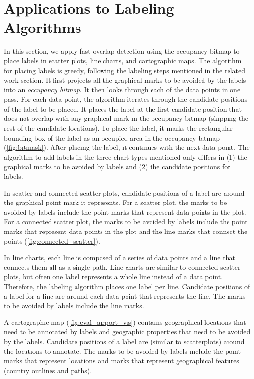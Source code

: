 \section{Applications to Labeling Algorithms}

In this section, we apply fast overlap detection using the occupancy bitmap
to place labels in scatter plots, line charts, and cartographic maps.
The algorithm for placing labels is greedy, following the labeling steps mentioned in the related work section.
It first projects all the graphical marks to be avoided by the labels into an \emph{occupancy bitmap}.
It then looks through each of the data points in one pass.
For each data point, the algorithm iterates through the candidate positions of the label to be placed.
It places the label at the first candidate position that does not overlap with any graphical mark in the occupancy bitmap (skipping the rest of the candidate locations).
To place the label, it marks the rectangular bounding box of the label as an occupied area in the occupancy bitmap (\autoref{fig:bitmask}).
After placing the label, it continues with the next data point.
The algorithm to add labels in the three chart types mentioned only differs in
(1) the graphical marks to be avoided by labels
and (2) the candidate positions for labels.

In scatter and connected scatter plots, candidate positions of a label are around the graphical point mark it represents.
For a scatter plot, the marks to be avoided by labels include the point marks that represent data points in the plot.
For a connected scatter plot, the marks to be avoided by labels include the point marks that represent data points in the plot and the line marks that connect the points (\autoref{fig:connected_scatter}).

In line charts, each line is composed of a series of data points and a line that connects them all as a single path.
Line charts are similar to connected scatter plots, but often one label represents a whole line instead of a data point.
Therefore, the labeling algorithm places one label per line.
Candidate positions of a label for a line are around each data point that represents the line.
The marks to be avoided by labels include the line marks.

A cartographic map (\autoref{fig:eval_airport_vis}) contains geographical locations that need to be annotated by labels and geographic properties that need to be avoided by the labels.
Candidate positions of a label are (similar to scatterplots) around the locations to annotate.
The marks to be avoided by labels include the point marks that represent locations and marks that represent geographical features (\eg country outlines and paths).
